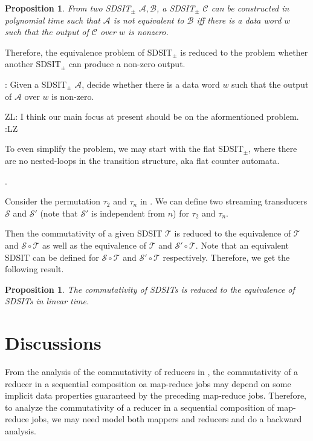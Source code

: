 \documentclass[11pt]{article}
\newtheorem{proposition}[theorem]{Proposition}
\def\Aa{{\mathscr{A} }}
\def\Bb{{\mathscr{B} }}
\def\Cc{{\mathscr{C} }}
\def\Ss{{\mathcal{S} }}
\def\Tt{{\mathcal{T} }}
\newcommand{\zhilin}[1]{\color{cyan} {ZL: #1 :LZ} \color{black}}
\begin{document}
\begin{proposition}
From two SDSIT$_{\pm}$ $\Aa,\Bb$, a SDSIT$_{\pm}$ $\Cc$ can be constructed in polynomial time such that $\Aa$ is not equivalent to $\Bb$ iff there is a data word $w$ such that the output of $\Cc$ over $w$ is nonzero. 
\end{proposition}

Therefore, the equivalence problem of SDSIT$_{\pm}$ is reduced to the problem whether another SDSIT$_{\pm}$ can produce a non-zero output.

\medskip

: Given a SDSIT$_{\pm}$ $\Aa$, decide whether there is a data word $w$ such that the output of $\Aa$ over $w$ is non-zero. 

\medskip

\zhilin{I think our main focus at present should be on the aformentioned problem.}

To even simplify the problem, we may start with the flat SDSIT$_{\pm}$, where there are no nested-loops in the transition structure, aka flat counter automata.

.

Consider the permutation $\tau_2$ and $\tau_n$ in \cite{CHSW15}. We can define two streaming transducers $\Ss$ and $\Ss'$ (note that $\Ss'$ is independent from $n$)  for $\tau_2$ and $\tau_n$.

Then the commutativity of a given SDSIT $\Tt$ is reduced to the equivalence of $\Tt$ and $\Ss \circ \Tt$ as well as the equivalence of $\Tt$ and $\Ss'\circ \Tt$. Note that an equivalent SDSIT can be defined for $\Ss \circ \Tt$ and $\Ss' \circ \Tt$ respectively. Therefore, we get the following result.

\begin{proposition}
The commutativity of SDSITs is reduced to the equivalence of SDSITs in linear time.
\end{proposition}

\section{Discussions}

From the analysis of the commutativity of reducers in \cite{XZZ+14}, the commutativity of a reducer in a sequential composition oa map-reduce jobs may depend on some implicit data properties guaranteed by the preceding map-reduce jobs. Therefore, to analyze the commutativity of a reducer in a sequential composition of map-reduce jobs, we may need model both mappers and reducers and do a backward analysis.



\end{document}

